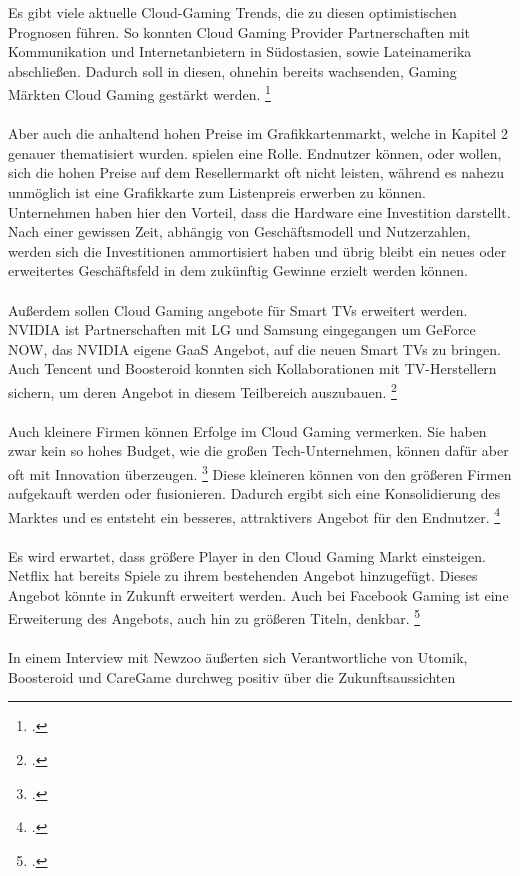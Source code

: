 \documentclass[12pt,toc=bib,toc=listof]{scrreprt}
\begin{document}
Es gibt viele aktuelle Cloud-Gaming Trends, die zu diesen optimistischen Prognosen führen. So konnten Cloud Gaming Provider 
Partnerschaften mit Kommunikation und Internetanbietern in Südostasien, sowie Lateinamerika abschließen. Dadurch soll in diesen, 
ohnehin bereits wachsenden, Gaming Märkten Cloud Gaming gestärkt werden. \footcite [Vgl.] [] {Fernandes.2022}
\\ \\
Aber auch die anhaltend hohen Preise im Grafikkartenmarkt, welche in Kapitel 2 genauer thematisiert wurden.
spielen eine Rolle. Endnutzer können, oder wollen, sich die hohen Preise auf dem Resellermarkt oft nicht leisten, während es nahezu 
unmöglich ist eine Grafikkarte zum Listenpreis erwerben zu können. Unternehmen haben hier den Vorteil, dass die Hardware eine Investition darstellt.
Nach einer gewissen Zeit, abhängig von Geschäftsmodell und Nutzerzahlen, werden sich die Investitionen ammortisiert haben und übrig 
bleibt ein neues oder erweitertes Geschäftsfeld in dem zukünftig Gewinne erzielt werden können.
\\ \\
Außerdem sollen Cloud Gaming angebote für Smart TVs erweitert werden. NVIDIA ist Partnerschaften mit LG und Samsung eingegangen 
um GeForce NOW, das NVIDIA eigene GaaS Angebot, auf die neuen Smart TVs zu bringen. Auch Tencent und Boosteroid konnten sich 
Kollaborationen mit TV-Herstellern sichern, um deren Angebot in diesem Teilbereich auszubauen. \footcite [Vgl.] [] {Fernandes.2022}
\\ \\
Auch kleinere Firmen können Erfolge im Cloud Gaming vermerken. Sie haben zwar kein so hohes Budget, wie die großen Tech-Unternehmen,
können dafür aber oft mit Innovation überzeugen. \footcite [Vgl.] [] {Ojala.2011} Diese kleineren können von den größeren Firmen aufgekauft werden oder fusionieren.
Dadurch ergibt sich eine Konsolidierung des Marktes und es entsteht ein besseres, attraktivers Angebot für den Endnutzer. \footcite [Vgl.] [] {Fernandes.2022}
\\ \\
Es wird erwartet, dass größere Player in den Cloud Gaming Markt einsteigen. Netflix hat bereits Spiele zu ihrem bestehenden Angebot
hinzugefügt. Dieses Angebot könnte in Zukunft erweitert werden. Auch bei Facebook Gaming ist eine Erweiterung des Angebots, auch hin zu
größeren Titeln, denkbar. \footcite [Vgl.] [] {Fernandes.2022}
\\ \\
In einem Interview mit Newzoo äußerten sich Verantwortliche von Utomik, Boosteroid und CareGame durchweg positiv über die Zukunftsaussichten
\end{document}
